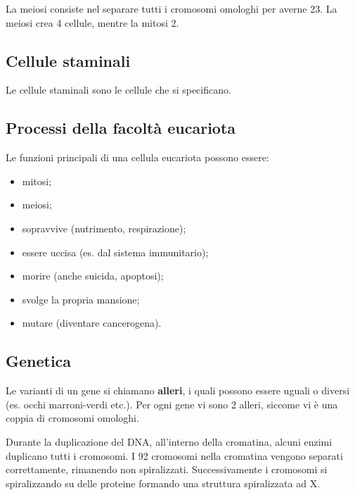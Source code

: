 \documentclass[a4paper]{article}
\begin{document}
La meiosi consiste nel separare tutti i cromosomi omologhi per averne 23.
La meiosi crea 4 cellule, mentre la mitosi 2.

\subsection{Cellule staminali}

Le cellule staminali sono le cellule che si specificano.

\subsection{Processi della facoltà eucariota}

Le funzioni principali di una cellula eucariota possono essere:

\begin{itemize}
    \item mitosi;
    \item meiosi;
    \item sopravvive (nutrimento, respirazione);
    \item essere uccisa (es. dal sistema immunitario);
    \item morire (anche suicida, apoptosi);
    \item svolge la propria mansione;
    \item mutare (diventare cancerogena).
\end{itemize}

\subsection{Genetica}


Le varianti di un gene si chiamano \textbf{alleri}, i quali possono essere uguali o diversi
(es. occhi marroni-verdi etc.). Per ogni gene vi sono 2 alleri, siccome vi è una coppia di cromosomi omologhi.


Durante la duplicazione del DNA, all'interno della cromatina,
alcuni enzimi duplicano tutti i cromosomi.
I 92 cromosomi nella cromatina vengono separati correttamente, rimanendo non spiralizzati.
Successivamente i cromosomi si spiralizzando su delle proteine formando una struttura spiralizzata ad X.
\end{document}
